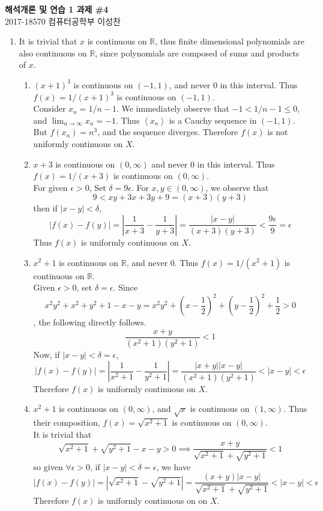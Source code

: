 \documentclass[11pt]{report}
\renewcommand{\span}[1]{\left\langle #1 \right\rangle}
\newcommand{\ra}{\rightarrow}
\newcommand{\abs}[1]{\left|#1\right|}
\newcommand{\imp}{\implies}
\newcommand{\R}{\mathbb{R}}
\begin{document}
\begin{center}
\textbf{\Large 해석개론 및 연습 1 과제 \#4}\\
\large 2017-18570 컴퓨터공학부 이성찬
\end{center}
\begin{enumerate}
\item It is trivial that $ x $ is continuous on $\R$, thus finite dimensional polynomials are also continuous on $\R$, since polynomials are composed of sums and products of $x$.
\begin{enumerate}
	\item $(x+1)^3$ is continuous on $(-1, 1)$, and never 0 in this interval. Thus $f(x) = 1/(x+1)^3$ is continuous on $(-1, 1)$.\\
	Consider $x_n = 1/n - 1$. We immediately observe that $-1 < 1/n - 1 \leq 0$, and $\lim_{n\ra\infty}x_n = -1$. Thus $\span{x_n}$ is a Cauchy sequence in $(-1, 1)$. But $f(x_n) = n^3$, and the sequence diverges. Therefore $f(x)$ is not uniformly continuous on $X$. 
	\item $x+3$ is continuous on $(0, \infty)$ and never 0 in this interval. Thus $f(x) = 1/(x+3)$ is continuous on $ (0, \infty) $.\\
	For given $\epsilon > 0$, Set $\delta = 9\epsilon$. For $x, y\in (0, \infty)$, we observe that $$9 < xy + 3x + 3y + 9 = (x+3)(y+3)$$ then if $\abs{x - y} < \delta$, $$\abs{f(x) -f(y)} = \abs{\frac{1}{x+3} - \frac{1}{y+3}} = \frac{\abs{x - y}}{(x+3)(y+3)} < \frac{9\epsilon}{9} = \epsilon$$Thus $f(x)$ is uniformly continuous on $X$.
	\item $x^2+1$ is continuous on $\R$, and never 0. Thus $f(x) = 1/(x^2+1)$ is continuous on $\R$.\\
	Given $\epsilon >0$, set $\delta = \epsilon$. Since $$x^2y^2 +x^2+y^2+1 - x - y = x^2y^2 + \left(x - \frac{1}{2}\right)^2 + \left(y - \frac{1}{2}\right)^2+ \frac{1}{2} > 0$$
	, the following directly follows. $$\frac{x+y}{(x^2+1)(y^2+1)} < 1$$
	Now, if $\abs{x - y} < \delta = \epsilon$, $$\abs{f(x) - f(y)} = \abs{\frac{1}{x^2+1} - \frac{1}{y^2+1}} = \frac{\abs{x + y}\abs{x - y}}{(x^2+ 1)(y^2+1)} < \abs{x - y}  < \epsilon$$
	Therefore $f(x)$ is uniformly continuous on $X$.
	\item $x^2+1$ is continuous on $(0, \infty)$, and $\sqrt{x}$ is continuous on $(1, \infty)$. Thus their composition, $f(x) = \sqrt{x^2+1}$ is continuous on $(0, \infty)$.\\
	It is trivial that $$\sqrt{x^2+1} + \sqrt{y^2+1} - x - y > 0 \imp \frac{x+y}{\sqrt{x^2+1}+\sqrt{y^2+1}} < 1$$ so given $\forall \epsilon > 0$, if $\abs{x - y} < \delta = \epsilon$, we have $$\abs{f(x) - f(y)} = \abs{\sqrt{x^2+1} - \sqrt{y^2+1}} = \frac{(x+y)\abs{x - y}}{\sqrt{x^2+1}+\sqrt{y^2+1}} <\abs{x - y} < \epsilon$$
	Therefore $f(x)$ is uniformly continuous on on $X$.
\end{enumerate}


\end{enumerate}
\end{document}
